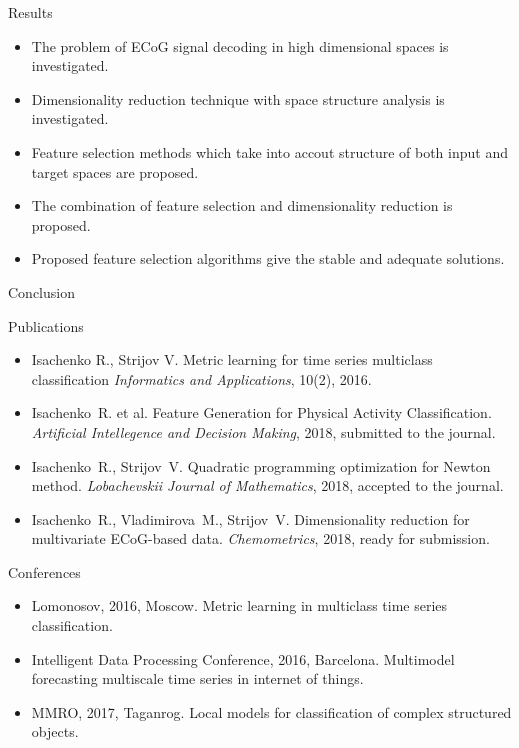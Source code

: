 \documentclass[9pt]{beamer}
\begin{document}
\begin{frame}{Results}
\begin{itemize}
	\item The problem of ECoG signal decoding in high dimensional spaces is investigated.
	\vfill
	\item Dimensionality reduction technique with space structure analysis is investigated.
	\vfill
	\item Feature selection methods which take into accout structure of both input and target spaces are proposed.
	\vfill
	\item The combination of feature selection and dimensionality reduction is proposed.
	\vfill
	\item Proposed feature selection algorithms give the stable and adequate solutions.
\end{itemize}
\end{frame}
\begin{frame}{Conclusion}
\begin{block}{Publications}
\vspace{-0.1cm}
\begin{itemize}
	\item Isachenko R., Strijov V. Metric learning for time series multiclass classification \emph{Informatics and Applications}, 10(2), 2016.
	\item Isachenko~R. et al. Feature Generation for Physical Activity Classification. \emph{Artificial Intellegence and Decision Making}, 2018, submitted to the journal.
	\item Isachenko~R., Strijov~V. Quadratic programming optimization for Newton method. \emph{Lobachevskii Journal of Mathematics}, 2018, accepted to the journal.
	\item Isachenko~R., Vladimirova~M., Strijov~V. Dimensionality reduction for multivariate ECoG-based data. \emph{Chemometrics}, 2018, ready for submission.
\end{itemize}
\end{block}
\vspace{-0.1cm}
\begin{block}{Conferences}
\vspace{-0.2cm}
\begin{itemize}
	\item Lomonosov, 2016, Moscow. Metric learning in multiclass time series classification.
	\item Intelligent Data Processing Conference, 2016, Barcelona. Multimodel forecasting multiscale time series in internet of things.
	\item MMRO, 2017, Taganrog. Local models for classification of complex structured objects.
\end{itemize}
\end{block}
\end{frame}
\end{document}
